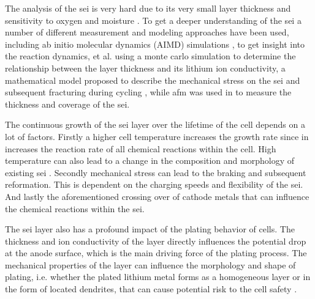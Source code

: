 The analysis of the \gls{sei} is very hard due to its very small layer thickness and sensitivity to oxygen and moisture \cite{An.2016}. To get a deeper understanding of the \gls{sei} a number of different measurement and modeling approaches have been used, including ab initio molecular dynamics (AIMD) simulations \cite{Soto.2018}, to get insight into the reaction dynamics,  \cite{Shinagawa.2017} et al. using a monte carlo simulation to determine the relationship between the layer thickness and its lithium ion conductivity, a mathematical model proposed to describe the mechanical stress on the \gls{sei} and subsequent fracturing during cycling \cite{Deshpandezand.2017}, while \gls{afm} was used in \cite{Bhattacharya.2012} to measure the thickness and coverage of the \gls{sei}. \par
The continuous growth of the \gls{sei} layer over the lifetime of the cell depends on a lot of factors. Firstly a higher cell temperature increases the growth rate since in increases the reaction rate of all chemical reactions within the cell. High temperature can also lead to a change in the composition and morphology of existing \gls{sei} \cite{Palacin.2018}. Secondly mechanical stress can lead to the braking and subsequent reformation. This is dependent on the charging speeds and flexibility of the \gls{sei}. And lastly the aforementioned crossing over of cathode metals that can influence the chemical reactions within the \gls{sei}.\par
The \gls{sei} layer also has a profound impact of the plating behavior of cells. The thickness and ion conductivity of the layer directly influences the potential drop at the anode surface, which is the main driving force of the plating process. The mechanical properties of the layer can influence the morphology and shape of plating, i.e. whether the plated lithium metal forms as a homogeneous layer or in the form of located dendrites, that can cause potential risk to the cell safety \cite{Bieker.2015}.

